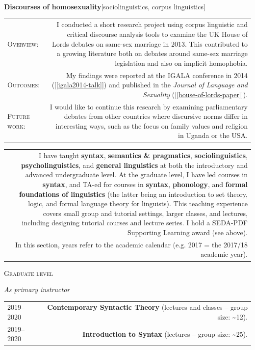 \documentclass[11pt,a4paper]{article}
\makeatletter
\newlength{\rulelength}%
\newcommand{\REx}[2]{%
\vspace*{0.1\baselineskip}%
{\large\textbf{#1}\hfill\textnormal{[#2]}}%
\vspace*{0.5\baselineskip}%
}
\newenvironment{cvsection}{%
  \setlength{\extrarowheight}{0.70ex}
  \begin{longtable}[l]{@{} L R @{}}
}{%
  \end{longtable}
}
\newcommand{\sref}[1]{[\ref{#1}]}
\newcommand{\researchsubhead}[1]{%
\textsc{#1}:%
}
\newcommand{\cvheading}[1]{\noindent{{\color{headercolor}\rule[0.4ex]{\rulelength}{2pt}\hspace*{9pt} \Large #1}}\vspace*{0.5\baselineskip}}
\newcommand{\cvsubhead}[1]{\noindent\hspace*{\rulelength}\hspace*{9pt} \textsc{#1}\vspace*{0.25\baselineskip}}
\newcommand{\rulesubhead}[1]{\noindent{\color{headercolor}\rule[0.4ex]{\rulelength}{1pt}\hspace*{9pt} {#1}}\vspace*{0.25\baselineskip}}
\newcommand{\cvsubsubhead}[1]{\noindent\hspace*{\rulelength}\hspace*{9pt} \textit{#1}\vspace*{0.25\baselineskip}}
\makeatother
\begin{document}
\REx{Discourses of homosexuality}{sociolinguistics, corpus linguistics}
\begin{cvsection}
  \researchsubhead{Overview} &%
  I conducted a short research project using corpus linguistic and critical discourse analysis tools to examine the UK House of Lords debates on same-sex marriage in 2013. This contributed to a growing literature both on debates around same-sex marriage legislation and also on implicit homophobia.%
\\
  \researchsubhead{Outcomes} &%
  My findings were reported at the IGALA conference in 2014 (\sref{igala2014-talk}) and published in the \textit{Journal of Language and Sexuality} (\sref{house-of-lords-paper}).%
\\
  \researchsubhead{Future work} &%
  I would like to continue this research by examining parliamentary debates from other countries where discursive norms differ in interesting ways, such as the focus on family values and religion in Uganda or the USA.
\end{cvsection}

\newpage

\cvheading{Teaching}

\begin{cvsection}
  &
  I have taught \textbf{syntax}, \textbf{semantics \& pragmatics}, \textbf{sociolinguistics}, \textbf{psycholinguistics}, and \textbf{general linguistics} at both the introductory and advanced undergraduate level. At the graduate level, I have led courses in \textbf{syntax}, and TA-ed for courses in \textbf{syntax}, \textbf{phonology}, and \textbf{formal foundations of linguistics} (the latter being an introduction to set theory, logic, and formal language theory for linguists). This teaching experience covers small group and tutorial settings, larger classes, and lectures, including designing tutorial courses and lecture series. I hold a SEDA-PDF Supporting Learning award (see above).\\
  & In this section, years refer to the academic calendar (e.g. 2017 = the
  2017/18 academic year).
\end{cvsection}

\rulesubhead{University of Oxford}

\cvsubhead{Graduate level}

\cvsubsubhead{As primary instructor}
\begin{cvsection}
    2019--2020        & \textbf{Contemporary Syntactic Theory} (lectures and classes -- group size: \textasciitilde{}12).\\
    2019--2020        & \textbf{Introduction to Syntax} (lectures -- group size: \textasciitilde{}25).
\end{cvsection}
\end{document}

